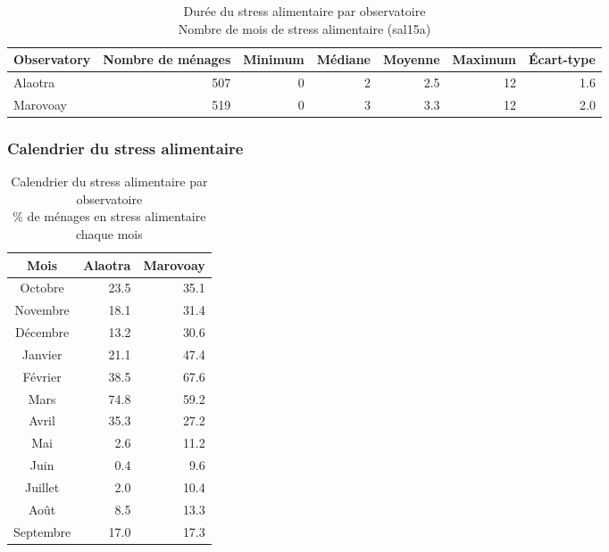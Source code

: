 \documentclass[
  french,
  letterpaper,
]{report}
\begin{document}
\begin{table}
\caption*{
{\fontsize{20}{25}\selectfont  Durée du stress alimentaire par observatoire\fontsize{12}{15}\selectfont } \\ 
{\fontsize{14}{17}\selectfont  Nombre de mois de stress alimentaire (sal15a)\fontsize{12}{15}\selectfont }
} 
\fontsize{12.0pt}{14.0pt}\selectfont
\begin{tabular*}{\linewidth}{@{\extracolsep{\fill}}lrrrrrr}
\toprule
{\bfseries Observatory} & Nombre de ménages & {\bfseries Minimum} & Médiane & {\bfseries Moyenne} & {\bfseries Maximum} & Écart-type \\ 
\midrule\addlinespace[2.5pt]
Alaotra & 507 & 0 & 2 & 2.5 & 12 & 1.6 \\ 
Marovoay & 519 & 0 & 3 & 3.3 & 12 & 2.0 \\ 
\bottomrule
\end{tabular*}
\end{table}

\subsubsection{Calendrier du stress
alimentaire}\label{calendrier-du-stress-alimentaire}

\begin{table}
\caption*{
{\fontsize{20}{25}\selectfont  Calendrier du stress alimentaire par observatoire\fontsize{12}{15}\selectfont } \\ 
{\fontsize{14}{17}\selectfont  \% de ménages en stress alimentaire chaque mois\fontsize{12}{15}\selectfont }
} 
\fontsize{12.0pt}{14.0pt}\selectfont
\begin{tabular*}{\linewidth}{@{\extracolsep{\fill}}crr}
\toprule
{\bfseries Mois} & {\bfseries Alaotra} & {\bfseries Marovoay} \\ 
\midrule\addlinespace[2.5pt]
Octobre & 23.5 & 35.1 \\ 
Novembre & 18.1 & 31.4 \\ 
Décembre & 13.2 & 30.6 \\ 
Janvier & 21.1 & 47.4 \\ 
Février & 38.5 & 67.6 \\ 
Mars & 74.8 & 59.2 \\ 
Avril & 35.3 & 27.2 \\ 
Mai & 2.6 & 11.2 \\ 
Juin & 0.4 & 9.6 \\ 
Juillet & 2.0 & 10.4 \\ 
Août & 8.5 & 13.3 \\ 
Septembre & 17.0 & 17.3 \\ 
\bottomrule
\end{tabular*}
\end{table}
\end{document}
